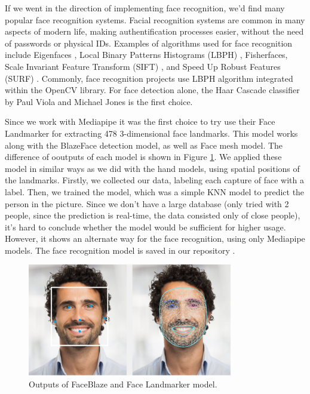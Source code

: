 If we went in the direction of implementing face recognition, we'd find many popular face recognition systems. Facial recognition systems are common in many aspects of modern life, making authentification processes easier, without the need of passwords or physical IDs.
Examples of algorithms used for face recognition include Eigenfaces \cite{CARIKCI2012118}, Local Binary Patterns Histograms (LBPH) \cite{inproceedings}, Fisherfaces, Scale Invariant Feature Transform (SIFT) \cite{articlefr}, and Speed Up Robust Features (SURF) \cite{10.1007/11744023_32}. Commonly, face recognition projects use LBPH algorithm integrated within the OpenCV library. For face detection alone, the Haar Cascade classifier by Paul Viola and Michael Jones \cite{inproceedings} is the first choice.

Since we work with Mediapipe it was the first choice to try use their Face Landmarker for extracting 478 3-dimensional face landmarks. This model works along with the BlazeFace detection model, as well as Face mesh model. The difference of ooutputs of each model is shown in Figure \ref{fig:face_landmark}.
We applied these model in similar ways as we did with the hand models, using spatial positions of the landmarks. Firstly, we collected our data, labeling each capture of face with a label. Then, we trained the model, which was a simple KNN model to predict the person in the picture. Since we don't have a large database (only tried with 2 people, since the prediction is real-time, the data consisted only of close people), it's hard to conclude whether the model would be sufficient for higher usage. However, it shows an alternate way for the face recognition, using only Mediapipe models. The face recognition model is saved in our repository \cite{touchlessdronecontrol}. 

\begin{figure}[h]
	\centering
	\includegraphics[width=0.8\textwidth]{images/face_landmark.png}
	\caption{Outputs of FaceBlaze and Face Landmarker model.}
	\label{fig:face_landmark}
\end{figure}




